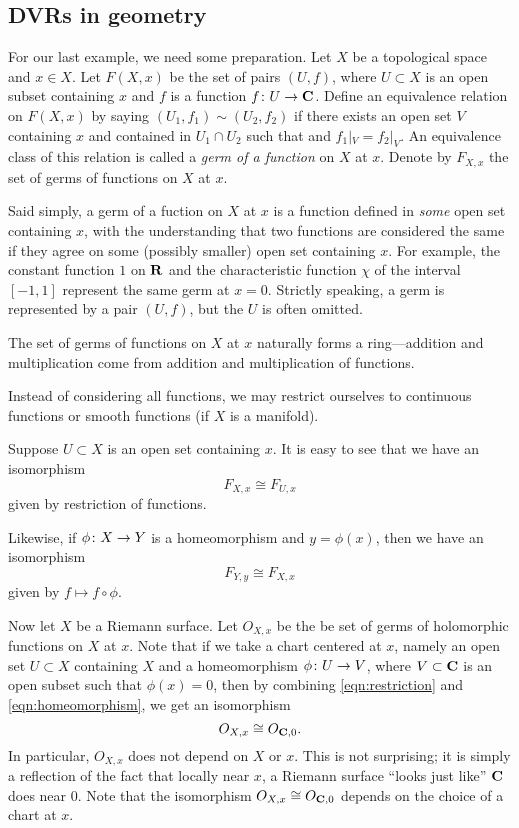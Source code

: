 \documentclass[12pt]{article}
\begin{document}
\subsection{DVRs in geometry}
For our last example, we need some preparation.
Let $X$ be a topological space and $x \in X$.
Let $F(X, x)$ be the set of pairs $(U, f)$, where $U \subset X$ is an open subset containing $x$ and $f$ is a function $f {\colon} U \to {\bf C}$.
Define an equivalence relation on $F(X, x)$ by saying $(U_1, f_1) \sim (U_2, f_2)$ if there exists an open set $V$ containing $x$ and contained in $U_1 \cap U_2$ such that and $f_1|_V = f_2|_V$.
An equivalence class of this relation is called a \emph{germ of a function} on $X$ at $x$.
Denote by $F_{X,x}$ the set of germs of functions on $X$ at $x$.

Said simply, a germ of a fuction on $X$ at $x$ is a function defined in \emph{some} open set containing $x$, with the understanding that two functions are considered the same if they agree on some (possibly smaller) open set containing $x$.
For example, the constant function $1$ on ${\bf R}$ and the characteristic function $\chi$ of the interval $[-1,1]$ represent the same germ at $x = 0$.
Strictly speaking, a germ is represented by a pair $(U, f)$, but the $U$ is often omitted.

The set of germs of functions on $X$ at $x$ naturally forms a ring---addition and multiplication come from addition and multiplication of functions.

Instead of considering all functions, we may restrict ourselves to continuous functions or smooth functions (if $X$ is a manifold).

Suppose $U \subset X$ is an open set containing $x$.
It is easy to see that we have an isomorphism
\begin{equation}\label{eqn:restriction}
  F_{X, x} \cong F_{U, x}
\end{equation}
given by restriction of functions.

Likewise, if $\phi {\colon} X \to Y$ is a homeomorphism and $y = \phi(x)$, then we have an isomorphism
\begin{equation}\label{eqn:homeomorphism}
  F_{Y, y} \cong F_{X, x}
\end{equation}
given by $f \mapsto f \circ \phi$.

Now let $X$ be a Riemann surface.
Let $O_{X,x}$ be the be set of germs of holomorphic functions on $X$ at $x$.
Note that if we take a chart centered at $x$, namely an open set $U \subset X$ containing $X$ and a homeomorphism $\phi {\colon} U \to V$, where $V \subset {\bf C}$ is an open subset such that $\phi(x) = 0$, then by combining \autoref{eqn:restriction} and \autoref{eqn:homeomorphism}, we get an isomorphism
\[ O_{X, x} \cong O_{{\bf C}, 0}.\]
In particular, $O_{X,x}$ does not depend on $X$ or $x$.
This is not surprising; it is simply a reflection of the fact that locally near $x$, a Riemann surface ``looks just like'' ${\bf C}$ does near $0$.
Note that the isomorphism $O_{X,x} \cong O_{{\bf C},0}$ depends on the choice of a chart at $x$.
\end{document}
